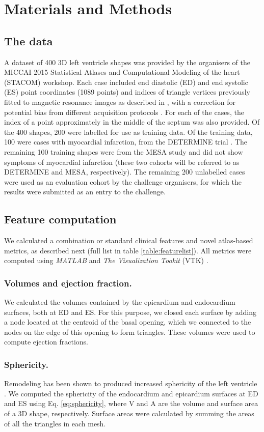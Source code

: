 \documentclass{llncs}
\begin{document}
\section{Materials and Methods}
	\subsection{The data}
A dataset of 400 3D left ventricle shapes was provided by the organisers of the MICCAI 2015 Statistical Atlases and Computational Modeling of the heart (STACOM) workshop. Each case included end diastolic (ED) and end systolic (ES) point coordinates (1089 points) and indices of triangle vertices previously fitted to magnetic resonance images as described in \cite{Young2000}, with a correction for potential bias from different acquisition protocols \cite{Medrano-Gracia2013}. For each of the cases, the index of a point approximately in the middle of the septum was also provided. Of the 400 shapes, 200 were labelled for use as training data. Of the training data, 100 were cases with myocardial infarction, from the DETERMINE trial \cite{Kadish2009}. The remaining 100 training shapes were from the MESA study \cite{Bild2002} and did not show symptoms of myocardial infarction (these two cohorts will be referred to as DETERMINE and MESA, respectively). The remaining 200 unlabelled cases were used as an evaluation cohort by the challenge organisers, for which the results were submitted as an entry to the challenge. 


	\subsection{Feature computation}
	We calculated a combination or standard clinical features and novel atlas-based metrics, as described next (full list in table \ref{table:featurelist}). All metrics were computed using \emph{\mbox{MATLAB}} and \emph{The Visualization Tookit} (VTK) \cite{Schroeder2006}.
	\subsubsection{Volumes and ejection fraction.}
We calculated the volumes contained by the epicardium and endocardium surfaces, both at ED and ES. For this purpose, we closed each surface by adding a node located at the centroid of the basal opening, which we connected to the nodes on the edge of this opening to form triangles. These volumes were used to compute ejection fractions. 
\subsubsection{Sphericity.}Remodeling has been shown to produced increased sphericity of the left ventricle \cite{Sutton2000}. We  computed the sphericity \cite{Wadell1933} of the endocardium and epicardium surfaces at ED and ES using Eq. \ref{eq:sphericity}, where V and A are the volume and surface area of a 3D shape, respectively. Surface areas were calculated by summing the areas of all the triangles in each mesh.
\end{document}
